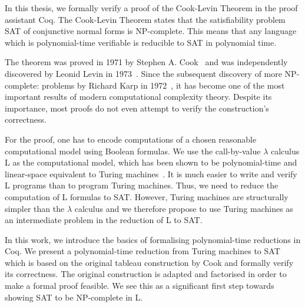 In this thesis, we formally verify a proof of the Cook-Levin Theorem in the proof assistant Coq.
The Cook-Levin Theorem states that the satisfiability problem SAT of conjunctive normal forms is NP-complete. 
This means that any language which is polynomial-time verifiable is reducible to SAT in polynomial time. 

The theorem was proved in 1971 by Stephen A. Cook~\cite{cook_theorem} and was independently discovered by Leonid Levin in 1973~\cite{levin_theorem}.
Since the subsequent discovery of more NP-complete: problems by Richard Karp in 1972~\cite{Karp1972}, it has become one of the most important results of modern computational complexity theory.
Despite its importance, most proofs do not even attempt to verify the construction's correctness.

For the proof, one has to encode computations of a chosen reasonable computational model using Boolean formulas. 
We use the call-by-value $\lambda$ calculus L as the computational model, which has been shown to be polynomial-time and linear-space equivalent to Turing machines~\cite{ForsterKunzeRoth:2019:wcbv-Reasonable}. It is much easier to write and verify L programs than to program Turing machines.
Thus, we need to reduce the computation of L formulas to SAT.
However, Turing machines are structurally simpler than the $\lambda$ calculus and we therefore propose to use Turing machines as an intermediate problem in the reduction of L to SAT.


In this work, we introduce the basics of formalising polynomial-time reductions in Coq. We present a polynomial-time reduction from Turing machines to SAT which is based on the original tableau construction by Cook and formally verify its correctness. The original construction is adapted and factorised in order to make a formal proof feasible. We see this as a significant first step towards showing SAT to be NP-complete in L.


